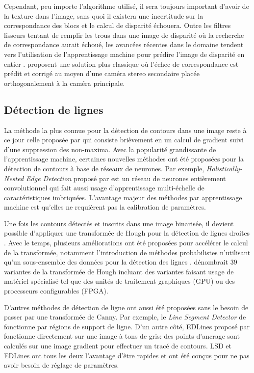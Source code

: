 Cependant, peu importe l'algorithme utilisé, il sera toujours important d'avoir de la texture dans l'image, sans quoi il existera une incertitude sur la correspondance des blocs et le calcul de disparité échouera. Outre les filtres lisseurs tentant de remplir les trous dans une image de disparité où la recherche de correspondance aurait échoué, les avancées récentes dans le domaine tendent vers l'utilisation de l'apprentissage machine pour prédire l'image de disparité en entier \citep{Kendall_2017_ICCV}. \cite{meier2017real} proposent une solution plus classique où l'échec de correspondance est prédit et corrigé au moyen d'une caméra stereo secondaire placée orthogonalement à la caméra principale.

\subsection{Détection de lignes}

La méthode la plus connue pour la détection de contours dans une image reste à ce jour celle proposée par \cite{Canny1986} qui consiste brièvement en un calcul de gradient suivi d'une suppression des non-maxima. Avec la popularité grandissante de l'apprentissage machine, certaines nouvelles méthodes ont été proposées pour la détection de contours à base de réseaux de neurones. Par exemple, \textit{Holistically-Nested Edge Detection} proposé par \cite{Xie2015} est un réseau de neurones entièrement convolutionnel qui fait aussi usage d'apprentissage multi-échelle de caractéristiques imbriquées. L'avantage majeur des méthodes par apprentissage machine est qu'elles ne requièrent pas la calibration de paramètres.

Une fois les contours détectés et inscrits dans une image binarisée, il devient possible d'appliquer une transformée de Hough pour la détection de lignes droites \citep{Duda1972}. Avec le temps, plusieurs améliorations ont été proposées pour accélérer le calcul de la transformée, notamment l'introduction de méthodes probabilistes n'utilisant qu'un sous-ensemble des données pour la détection des lignes \citep{Matas2000}. \cite{Herout2013} dénombrait 39 variantes de la transformée de Hough incluant des variantes faisant usage de matériel spécialisé tel que des unités de traitement graphiques (GPU) ou des processeurs configurables (FPGA).

D'autres méthodes de détection de ligne ont aussi été proposées sans le besoin de passer par une transformée de Canny. Par exemple, le \textit{Line Segment Detector} de \citep{Gioi2012lsd} fonctionne par régions de support de ligne. D'un autre côté, EDLines proposé par \citep{AKINLAR20111633} fonctionne directement sur une image à tons de gris: des points d'ancrage sont calculés sur une image gradient pour effectuer un tracé de contours. LSD et EDLines ont tous les deux l'avantage d'être rapides et ont été conçus pour ne pas avoir besoin de réglage de paramètres.

